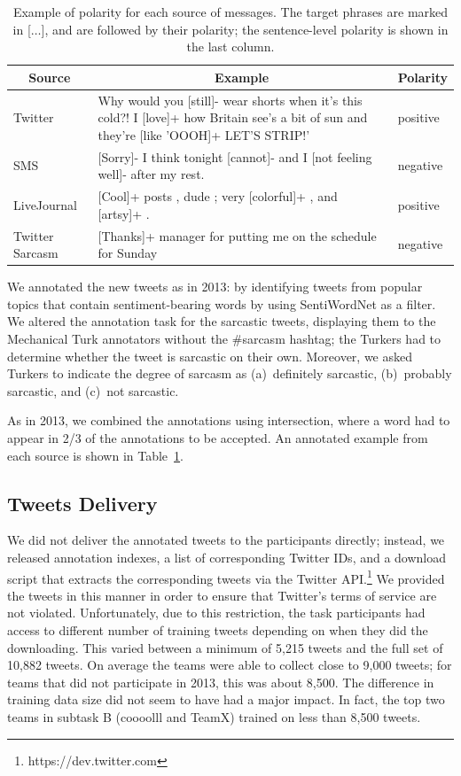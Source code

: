 \documentclass[11pt]{article}
\begin{document}
\begin{table}[t]
\small
\begin{center}
\begin{tabular}{|l |p{11cm}|l|}
\hline
\multicolumn{1}{|c|}{\bf Source} & \multicolumn{1}{|c|}{\bf Example} & \bf Polarity \\
\hline
Twitter & Why would you [still]- wear shorts when it's this cold?!  I [love]+ how Britain see's a bit of sun and they're [like 'OOOH]+ LET'S STRIP!' & positive \\
\hline
SMS & [Sorry]- I think tonight [cannot]- and I [not feeling well]- after my rest. & negative \\
\hline
LiveJournal & [Cool]+ posts , dude ; very [colorful]+ , and [artsy]+ . & positive \\
\hline
Twitter Sarcasm & [Thanks]+ manager for putting me on the schedule for Sunday & negative \\
\hline
\end{tabular}
\caption{Example of polarity for each source of messages.
        The target phrases are marked in [$\ldots$], and are followed by their polarity;
        the sentence-level polarity is shown in the last column.}
\label{T:Examples}
\end{center}
\end{table}

We annotated the new tweets as in 2013:
by identifying tweets from popular topics that contain sentiment-bearing words by using SentiWordNet \cite{swn} as a filter. We altered the annotation task for the sarcastic tweets,
displaying them to the Mechanical Turk annotators without the \#sarcasm hashtag; the Turkers had to determine whether the tweet is sarcastic on their own. Moreover, we asked Turkers to indicate the degree of sarcasm as (a)~definitely sarcastic, (b)~probably sarcastic, and (c)~not sarcastic.

As in 2013, we combined the annotations using intersection,
where a word had to appear in 2/3 of the annotations to be accepted.
An annotated example from each source is shown in Table~\ref{T:Examples}.

\subsection{Tweets Delivery}

We did not deliver the annotated tweets to the participants directly;
instead, we released annotation indexes, a list of corresponding Twitter IDs,
and a download script that extracts the corresponding tweets via the Twitter API.\footnote{https://dev.twitter.com}
We provided the tweets in this manner in order to ensure that Twitter's terms of service are not violated. Unfortunately, due to this restriction, the task participants had access to different number of training tweets
depending on when they did the downloading.
This varied between a minimum of 5,215 tweets and the full set of 10,882 tweets.
On average the teams were able to collect close to 9,000 tweets;
for teams that did not participate in 2013, this was about 8,500.
The difference in training data size did not seem to have had a major impact.
In fact, the top two teams in subtask B (coooolll and TeamX) trained on less than 8,500 tweets.
\end{document}
